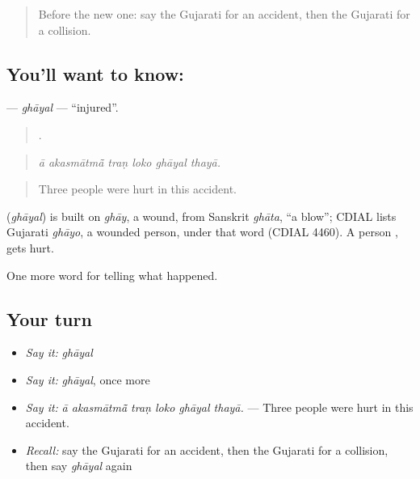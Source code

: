 \label{lesson:GU-C293-ghayal}



\begin{quote}
Before the new one: say the Gujarati for an accident, then the Gujarati for a collision.
\end{quote}

\subsection*{You'll want to know: }
\textbf{} — \emph{ghāyal} — \textquotedblleft{}injured\textquotedblright{}.

\begin{quote}
     .
\end{quote}

\begin{quote}
\emph{ā akasmātmā̃ traṇ loko ghāyal thayā.}
\end{quote}

\begin{quote}
Three people were hurt in this accident.
\end{quote}

\begin{cousinweb}
\textbf{} (\emph{ghāyal}) is built on \emph{ghāy}, a wound, from Sanskrit \emph{ghāta}, \textquotedblleft{}a blow\textquotedblright{}; CDIAL lists Gujarati \emph{ghāyo}, a wounded person, under that word (CDIAL 4460). A person \textbf{  }, gets hurt.
\end{cousinweb}

\begin{grammarlens}[title={What you've built}]
One more word for telling what happened.
\end{grammarlens}

\subsection*{Your turn}
\begin{itemize}
\raggedright
  \item \emph{Say it:} \emph{ghāyal}
  \item \emph{Say it:} \emph{ghāyal}, once more
  \item \emph{Say it:} \emph{ā akasmātmā̃ traṇ loko ghāyal thayā.} — Three people were hurt in this accident.
  \item \emph{Recall:} say the Gujarati for an accident, then the Gujarati for a collision, then say \emph{ghāyal} again
\end{itemize}

